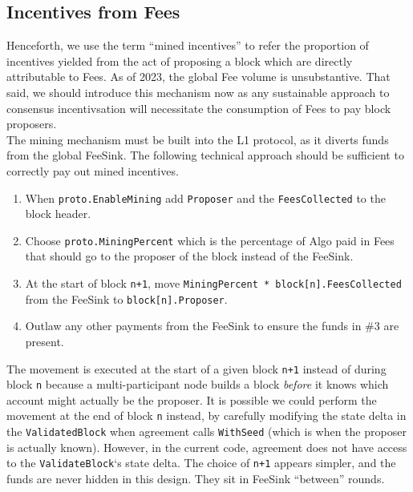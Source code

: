 \documentclass[11pt,a4paper]{article}
\begin{document}
\subsection{Incentives from Fees}
Henceforth, we use the term “mined incentives” to refer the proportion of incentives yielded from the act of proposing 
a block which are directly attributable to Fees. As of 2023, the global Fee volume is unsubstantive. That said, we 
should introduce this mechanism now as any sustainable approach to consensus incentivsation will necessitate the 
consumption of Fees to pay block proposers. \\

The mining mechanism must be built into the L1 protocol, as it diverts funds from the global \gls{FeeSink}. The 
following technical approach should be sufficient to correctly pay out mined incentives.

\begin{enumerate}
    \item When \texttt{proto.EnableMining} add \texttt{Proposer} and the \texttt{FeesCollected} to the block header.
    \item Choose \texttt{proto.MiningPercent} which is the percentage of Algo paid in Fees that should go to the 
          proposer of the block instead of the \gls{FeeSink}.
    \item At the start of block \texttt{n+1}, move \texttt{MiningPercent * block[n].FeesCollected} from the 
          \gls{FeeSink} to \texttt{block[n].Proposer}.
    \item Outlaw any other payments from the \gls{FeeSink} to ensure the funds in \#3 are present.

\end{enumerate}

The movement is executed at the start of a given block \texttt{n+1} instead of during block \texttt{n} because a 
multi-participant node builds a block \textit{before} it knows which account might actually be the proposer. It is 
possible we could perform the movement at the end of block \texttt{n} instead, by carefully modifying the state delta in 
the \texttt{ValidatedBlock} when agreement calls \texttt{WithSeed} (which is when the proposer is actually known). 
However, in the current code, agreement does not have access to the \texttt{ValidateBlock}‘s state delta. The choice of 
\texttt{n+1} appears simpler, and the funds are never hidden in this design. They sit in \gls{FeeSink} “between” rounds.
\end{document}
